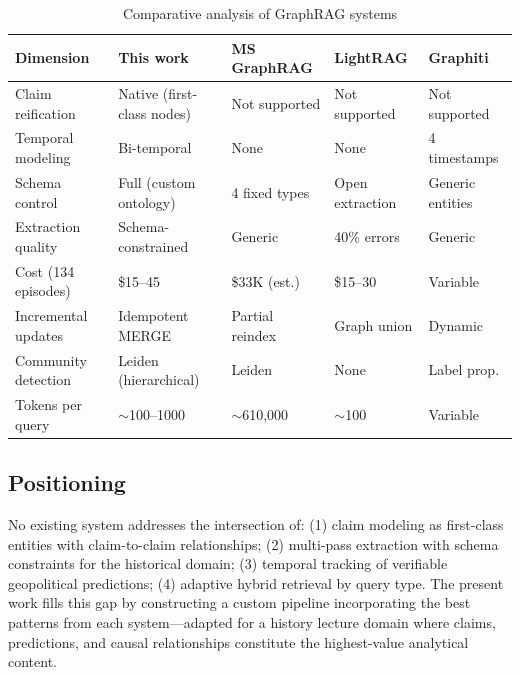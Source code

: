 \begin{table}[htbp]
\centering
\caption{Comparative analysis of GraphRAG systems}
\label{tab:comparison}
\small
\begin{tabularx}{\textwidth}{lXXXX}
\toprule
\textbf{Dimension} & \textbf{This work} & \textbf{MS GraphRAG} & \textbf{LightRAG} & \textbf{Graphiti} \\
\midrule
Claim reification & Native (first-class nodes) & Not supported & Not supported & Not supported \\
Temporal modeling & Bi-temporal & None & None & 4 timestamps \\
Schema control & Full (custom ontology) & 4 fixed types & Open extraction & Generic entities \\
Extraction quality & Schema-constrained & Generic & 40\% errors & Generic \\
Cost (134 episodes) & \$15--45 & \$33K (est.) & \$15--30 & Variable \\
Incremental updates & Idempotent MERGE & Partial reindex & Graph union & Dynamic \\
Community detection & Leiden (hierarchical) & Leiden & None & Label prop. \\
Tokens per query & $\sim$100--1000 & $\sim$610,000 & $\sim$100 & Variable \\
\bottomrule
\end{tabularx}
\end{table}

\subsection{Positioning}

No existing system addresses the intersection of: (1) claim modeling as first-class entities with claim-to-claim relationships; (2) multi-pass extraction with schema constraints for the historical domain; (3) temporal tracking of verifiable geopolitical predictions; (4) adaptive hybrid retrieval by query type. The present work fills this gap by constructing a custom pipeline incorporating the best patterns from each system---adapted for a history lecture domain where claims, predictions, and causal relationships constitute the highest-value analytical content.
